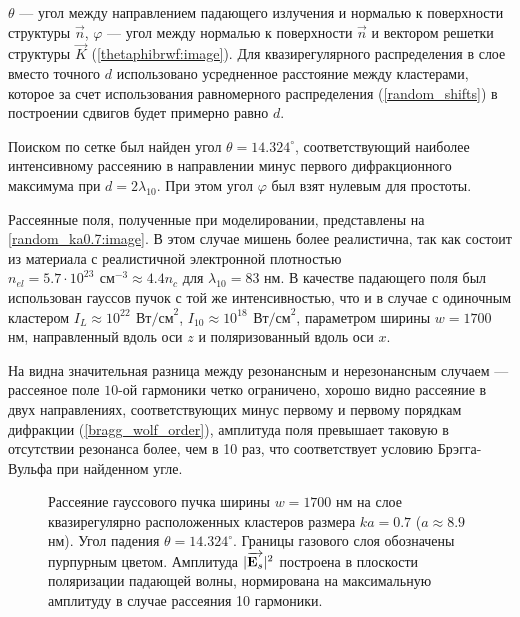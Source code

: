  $\theta$ --- угол между направлением падающего излучения и нормалью к поверхности структуры $\vec{n}$, $\varphi$ --- угол между нормалью к поверхности $\vec{n}$ и вектором решетки структуры $\vec{K}$ (\autoref{thetaphibrwf:image}). Для квазирегулярного распределения в слое вместо точного $d$ использовано усредненное расстояние между кластерами, которое за счет использования равномерного распределения (\autoref{random_shifts}) в построении сдвигов будет примерно равно $d$.


Поиском по сетке был найден угол $\theta = 14.324^{\circ}$, соответствующий наиболее интенсивному рассеянию в направлении минус первого дифракционного максимума при $d = 2\lambda_{10}$. При этом угол $\varphi$ был взят нулевым для простоты.

Рассеянные поля, полученные при моделировании, представлены на \autoref{random_ka0.7:image}. В этом случае мишень более реалистична, так как состоит из материала с реалистичной электронной плотностью $n_{el} = 5.7 \cdot 10^{23}\:\,\textrm{см}^{-3} \approx 4.4 n_{c}$ для $\lambda_{10} = 83$ нм. В качестве падающего поля был использован гауссов пучок с той же интенсивностью, что и в случае с одиночным кластером $I_{L} \approx 10^{22}\:\,\textrm{Вт/см}^2$, $I_{10} \approx 10^{18}\:\,\textrm{Вт/см}^2$, параметром ширины $w = 1700$ нм, направленный вдоль оси $z$ и поляризованный вдоль оси $x$.

На  видна значительная разница между резонансным и нерезонансным случаем --- рассеяное поле $10$-ой гармоники четко ограничено, хорошо видно рассеяние в двух направлениях, соответствующих минус первому и первому порядкам дифракции (\autoref{bragg_wolf_order}), амплитуда поля превышает таковую в отсутствии резонанса более, чем в 10 раз, что соответствует условию Брэгга-Вульфа при найденном угле.

    \begin{figure}[htb]
        \hfil
        \caption{Рассеяние гауссового пучка ширины $w = 1700$ нм на слое квазирегулярно расположенных кластеров размера $ka = 0.7$ ($a \approx 8.9$ нм). Угол падения $\theta = 14.324^{\circ}$. Границы газового слоя обозначены пурпурным цветом. Амплитуда $|\overrightarrow{\textbf{E}_{s}}|^2$ построена в плоскости поляризации падающей волны, нормирована на максимальную амплитуду в случае рассеяния 10 гармоники.}\label{random_ka0.7:image}
    \end{figure}


